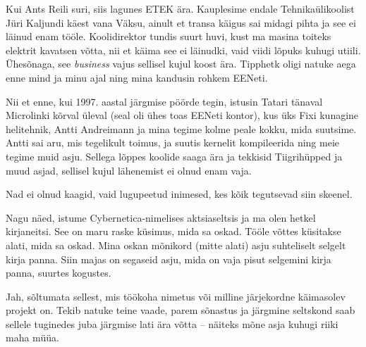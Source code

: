 Kui Ants Reili suri, siis lagunes ETEK ära. 
Kauplesime endale Tehnikaülikoolist Jüri 
Kaljundi käest vana Väksu, ainult et 
transa käigus sai midagi pihta ja see ei läinud enam tööle. Koolidirektor tundis suurt
huvi, kust ma masina toiteks elektrit kavatsen võtta, nii et käima see 
ei läinudki, vaid viidi lõpuks kuhugi utiili. Ühesõnaga, see \emph{business} vajus 
sellisel kujul koost ära. Tipphetk oligi natuke aega enne mind ja minu 
ajal ning mina kandusin rohkem EENeti. 

Nii et enne, kui 1997. aastal järgmise pöörde tegin, istusin 
Tatari tänaval Microlinki kõrval üleval (seal oli ühes toas EENeti kontor), kus 
üks Fixi kunagine helitehnik, Antti Andreimann ja mina tegime kolme peale kokku, mida suutsime. Antti 
sai aru, mis tegelikult toimus, ja suutis kernelit kompileerida ning meie tegime 
muid asju. Sellega lõppes koolide saaga ära ja tekkisid 
Tiigrihüpped ja muud asjad, sellisel kujul lähenemist ei 
olnud enam vaja. 


Nad ei olnud kaagid, vaid lugupeetud inimesed, kes kõik tegutsevad siin skeenel. 


Nagu näed, istume Cybernetica-nimelises aktsiaseltsis ja 
ma olen hetkel kirjaneitsi. See on maru raske küsimus, mida sa oskad. 
Tööle võttes küsitakse alati, mida sa oskad. Mina oskan mõnikord (mitte 
alati) asju suhteliselt selgelt kirja panna. Siin 
majas on segaseid asju, mida on vaja pisut selgemini kirja panna, suurtes 
kogustes. 


Jah, sõltumata sellest, mis töökoha nimetus või milline järjekordne 
käimasolev projekt on. Tekib natuke teine vaade, 
parem sõnastus ja järgmine seltskond saab sellele tuginedes juba järgmise 
lati ära võtta -- näiteks mõne asja kuhugi riiki maha müüa. 